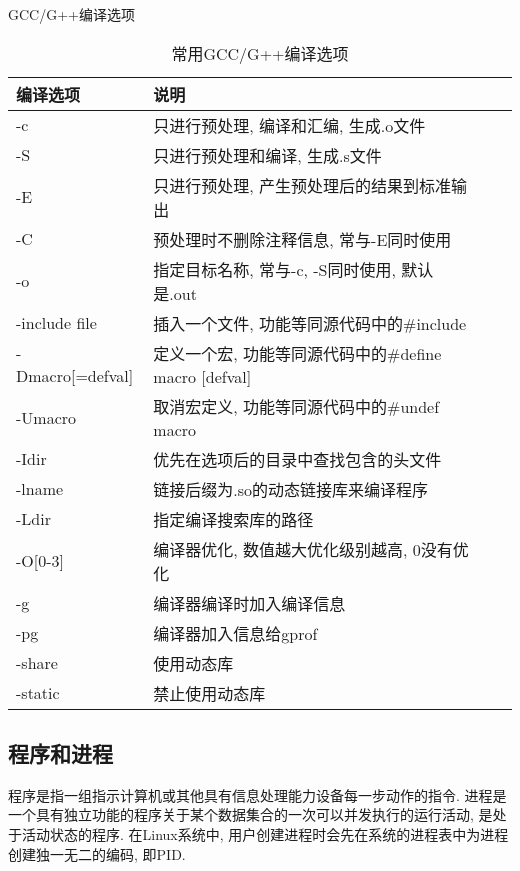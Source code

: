 GCC/G++编译选项
\begin{table}[H]
\small %
\sffamily %
\centering %
\renewcommand{\arraystretch}{1.4} %
\caption{常用GCC/G++编译选项}
\begin{tabular}{*{2}{l|l}}
 \hline
 \bfseries 编译选项 & \bfseries 说明 \\
 \hline
 -c & 只进行预处理, 编译和汇编, 生成.o文件\\
 \hline
 -S & 只进行预处理和编译, 生成.s文件\\
 \hline
 -E & 只进行预处理, 产生预处理后的结果到标准输出\\
 \hline
 -C & 预处理时不删除注释信息, 常与-E同时使用\\
 \hline
 -o & 指定目标名称, 常与-c, -S同时使用, 默认是.out\\
 \hline
 -include file & 插入一个文件, 功能等同源代码中的\#include\\
 \hline
 -Dmacro[=defval] & 定义一个宏, 功能等同源代码中的\#define macro [defval]\\
 \hline
 -Umacro & 取消宏定义, 功能等同源代码中的\#undef macro\\
 \hline
 -Idir & 优先在选项后的目录中查找包含的头文件\\
 \hline
 -lname & 链接后缀为.so的动态链接库来编译程序\\
 \hline
 -Ldir & 指定编译搜索库的路径\\
 \hline
 -O[0-3] & 编译器优化, 数值越大优化级别越高, 0没有优化\\
 \hline
 -g & 编译器编译时加入编译信息\\
 \hline
 -pg & 编译器加入信息给gprof\\
 \hline
 -share & 使用动态库\\
 \hline
 -static & 禁止使用动态库\\
 \hline
\end{tabular}
\end{table}


\subsection{程序和进程}

程序是指一组指示计算机或其他具有信息处理能力设备每一步动作的指令.
进程是一个具有独立功能的程序关于某个数据集合的一次可以并发执行的运行活动, 
是处于活动状态的程序. 
在Linux系统中, 用户创建进程时会先在系统的进程表中为进程创建独一无二的编码,
即PID.

